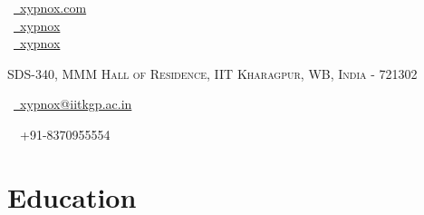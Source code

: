 \documentclass[a4paper,12pt]{extarticle} %
\begin{document}
\pagestyle{empty} %


\begin{multicols}{3}
\normalsize  \faGlobe\ {\href{http://xypnox.com/}{\  xypnox.com}}\\
\normalsize \faGithub\ {\href{https://github.com/xypnox}{\  xypnox}}\\
\normalsize  \faTwitter\ {\href{https://twitter.com/xypnox}{\  xypnox}}\\
\columnbreak
\normalsize\par{\par} %
\par{\centering\normalsize {\textsc{SDS-340, MMM Hall of Residence, IIT Kharagpur, WB, India - 721302}}\hfill\par}
\columnbreak
\raggedright\hfill\normalsize \faEnvelope\ {\href{mailto:xypnox@iitkgp.ac.in}{\  xypnox@iitkgp.ac.in}}\\
\raggedright\hfill{\faPhone\ \  +91-8370955554}
\end{multicols}

\vspace{-0.5cm}



\section{\textcolor{primary}{Education}}
\end{document}
